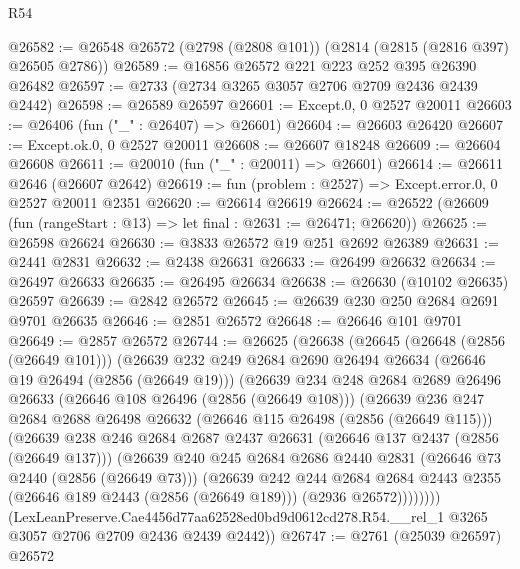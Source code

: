 \begin{lexlean}{R54}
\begin{coremodule}
@26582 := @26548 @26572 (@2798 (@2808 @101)) (@2814 (@2815 (@2816 @397) @26505 @2786))
@26589 := @16856 @26572 @221 @223 @252 @395 @26390 @26482
@26597 := @2733 (@2734 @3265 @3057 @2706 @2709 @2436 @2439 @2442)
@26598 := @26589 @26597
@26601 := Except.{0, 0} @2527 @20011
@26603 := @26406 (fun ("_" : @26407) => @26601)
@26604 := @26603 @26420
@26607 := Except.ok.{0, 0} @2527 @20011
@26608 := @26607 @18248
@26609 := @26604 @26608
@26611 := @20010 (fun ("_" : @20011) => @26601)
@26614 := @26611 @2646 (@26607 @2642)
@26619 := fun (problem : @2527) => Except.error.{0, 0} @2527 @20011 @2351
@26620 := @26614 @26619
@26624 := @26522 (@26609 (fun (rangeStart : @13) => let final : @2631 := @26471; @26620))
@26625 := @26598 @26624
@26630 := @3833 @26572 @19 @251 @2692 @26389
@26631 := @2441 @2831
@26632 := @2438 @26631
@26633 := @26499 @26632
@26634 := @26497 @26633
@26635 := @26495 @26634
@26638 := @26630 (@10102 @26635) @26597
@26639 := @2842 @26572
@26645 := @26639 @230 @250 @2684 @2691 @9701 @26635
@26646 := @2851 @26572
@26648 := @26646 @101 @9701
@26649 := @2857 @26572
@26744 := @26625
    (@26638
      (@26645
        (@26648 (@2856 (@26649 @101)))
        (@26639
          @232
          @249
          @2684
          @2690
          @26494
          @26634
          (@26646 @19 @26494 (@2856 (@26649 @19)))
          (@26639
            @234
            @248
            @2684
            @2689
            @26496
            @26633
            (@26646 @108 @26496 (@2856 (@26649 @108)))
            (@26639
              @236
              @247
              @2684
              @2688
              @26498
              @26632
              (@26646 @115 @26498 (@2856 (@26649 @115)))
              (@26639
                @238
                @246
                @2684
                @2687
                @2437
                @26631
                (@26646 @137 @2437 (@2856 (@26649 @137)))
                (@26639
                  @240
                  @245
                  @2684
                  @2686
                  @2440
                  @2831
                  (@26646 @73 @2440 (@2856 (@26649 @73)))
                  (@26639
                    @242
                    @244
                    @2684
                    @2684
                    @2443
                    @2355
                    (@26646 @189 @2443 (@2856 (@26649 @189)))
                    (@2936 @26572))))))))
      (LexLeanPreserve.Cae4456d77aa62528ed0bd9d0612cd278.R54.__rel_1
        @3265
        @3057
        @2706
        @2709
        @2436
        @2439
        @2442))
@26747 := @2761 (@25039 @26597) @26572

\end{coremodule}
\end{lexlean}
